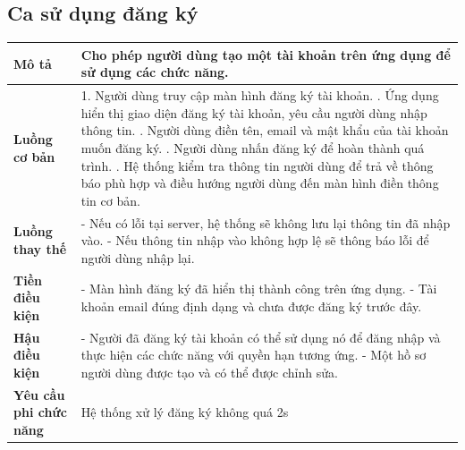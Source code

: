 \subsection{Ca sử dụng đăng ký}
\vspace{0.5cm}


\noindent 
\begin{tabularx}{\linewidth}{| l | X |} 
\hline 
\textbf{Mô tả} & Cho phép người dùng tạo một tài khoản trên ứng dụng để sử dụng các chức năng. \\ 
\hline 
\textbf{Luồng cơ bản} & 1. Người dùng truy cập màn hình đăng ký tài khoản. \newline
                       2. Ứng dụng hiển thị giao diện đăng ký tài khoản, yêu cầu người dùng nhập thông tin. \newline
                       3. Người dùng điền tên, email và mật khẩu của tài khoản muốn đăng ký. \newline
                       4. Người dùng nhấn đăng ký để hoàn thành quá trình. \newline
                       5. Hệ thống kiểm tra thông tin người dùng để trả về thông báo phù hợp và điều hướng người dùng đến màn hình điền thông tin cơ bản. \\ 
\hline 
\textbf{Luồng thay thế} &
                       - Nếu có lỗi tại server, hệ thống sẽ không lưu lại thông tin đã nhập vào. \newline
                       - Nếu thông tin nhập vào không hợp lệ sẽ thông báo lỗi để người dùng nhập lại. \\ 
\hline 
\textbf{Tiền điều kiện} & - Màn hình đăng ký đã hiển thị thành công trên ứng dụng. \newline
                       - Tài khoản email đúng định dạng và chưa được đăng ký trước đây. \\ 
\hline 
\textbf{Hậu điều kiện} & - Người đã đăng ký tài khoản có thể sử dụng nó để đăng nhập và thực hiện các chức năng với quyền hạn tương ứng. \newline
                       - Một hồ sơ người dùng được tạo và có thể được chỉnh sửa. \\ 
\hline 
\textbf{Yêu cầu phi chức năng} & Hệ thống xử lý đăng ký không quá 2s \\ 
\hline 
\end{tabularx}

\vspace{0.8cm}

